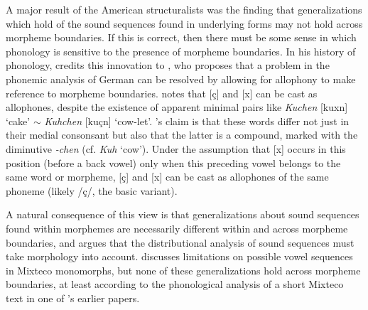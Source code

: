 A major result of the American structuralists was the finding that generalizations which hold of the sound sequences found in underlying forms may not hold across morpheme boundaries. If this is correct, then there must be some sense in which phonology is sensitive to the presence of morpheme boundaries. In his history of phonology, \citet[][267]{Anderson1985} credits this innovation to \citet{Bloomfield1930}, who proposes that a problem in the phonemic analysis of German can be resolved by allowing for allophony to make reference to morpheme boundaries. \citeauthor{Bloomfield1930} notes that [\c{c}] and [x] can be cast as allophones, despite the existence of apparent minimal pairs like \emph{Kuchen} [ku\lm x\textschwa n] `cake' $\sim$ \emph{Kuhchen} [ku\lm\c{c}\textschwa n] `cow-let'. \citeauthor{Bloomfield1930}'s claim is that these words differ not just in their medial consonsant but also that the latter is a compound, marked with the diminutive \emph{-chen} (cf. \emph{Kuh} `cow'). Under the assumption that [x] occurs in this position (before a back vowel) only when this preceding vowel belongs to the same word or morpheme, [\c{c}] and [x] can be cast as allophones of the same phoneme (likely /\c{c}/, the basic variant). 

A natural consequence of this view is that generalizations about sound sequences found within morphemes are necessarily different within and across morpheme boundaries, and \citet{Pike1947b} argues that the distributional analysis of sound sequences must take morphology into account. \citeauthor{Pike1947b} discusses limitations on possible vowel sequences in Mixteco monomorphs, but none of these generalizations hold across morpheme boundaries, at least according to the phonological analysis of a short Mixteco text in one of \citeauthor{Pike1944}'s earlier papers.

